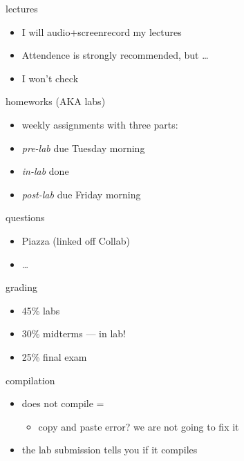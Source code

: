 

\begin{frame}{lectures}
    \begin{itemize}
    \item I will audio+screenrecord my lectures
    \item Attendence is strongly recommended, but \ldots
    \item I won't check
    \end{itemize}
\end{frame}

\begin{frame}{homeworks (AKA labs)}
    \begin{itemize}
    \item weekly assignments with three parts:
    \vspace{.5cm}
    \item \textit{pre-lab} due Tuesday morning
    \item \textit{in-lab} done 
    \item \textit{post-lab} due Friday morning
    \end{itemize}
\end{frame}

\begin{frame}{questions}
    \begin{itemize}
    \item Piazza (linked off Collab)
    \item \ldots
    \end{itemize}
\end{frame}

\begin{frame}{grading}
    \begin{itemize}
    \item 45\% labs
    \item 30\% midterms --- in lab!
    \item 25\% final exam
    \end{itemize}
\end{frame}

\begin{frame}{compilation}
    \begin{itemize}
    \item does not compile = 
        \begin{itemize}
        \item copy and paste error? we are not going to fix it
        \end{itemize}
    \vspace{.5cm}
    \item the lab submission tells you if it compiles
    \end{itemize}
\end{frame}

